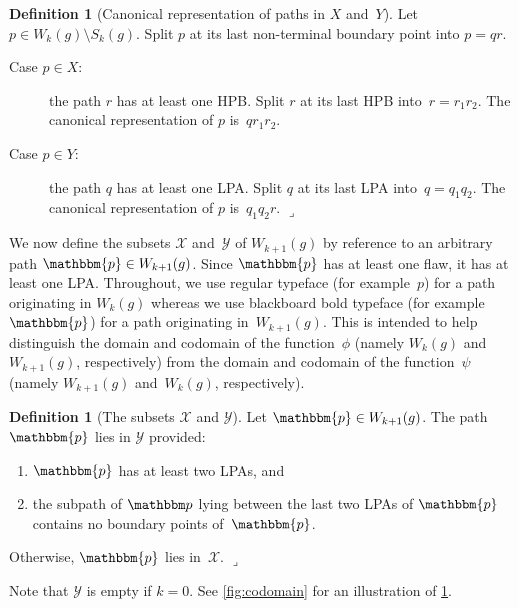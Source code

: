 \documentclass[11pt]{article}
\newcommand{\lrcornerqed}[0]{}
\renewcommand{\lrcornerqed}[0]{\hfill $\lrcorner$} %
\theoremstyle{definition} %
\newtheorem{definition}[thm]{Definition}
\numberwithin{equation}{section}
\begin{document}
\begin{definition}[Canonical representation of paths in $X$ and~$Y$]
\label{def:domain_split}
    Let $p \in W_k(g) \setminus S_k(g)$. Split $p$ at its last non-terminal boundary point into $p = q r$.
    \begin{description}

            \item[Case $p \in X$:]
            the path $r$ has at least one HPB. Split $r$ at its last HPB into~$r = r_1 r_2$. The canonical representation of $p$ is~$q r_1 r_2$.
    
        \item[Case $p \in Y$:]
            the path $q$ has at least one LPA. Split $q$ at its last LPA into~$q = q_1 q_2$. The canonical representation of $p$ is~$q_1 q_2 r$. \lrcornerqed
    \end{description}
\end{definition}


We now define the subsets $\mathcal{X}$ and~$\mathcal{Y}$ of $W_{k+1}(g)$ by reference to an arbitrary path $\mathbbm{p} \in W_{k+1}(g)$. 
Since $\mathbbm{p}$ has at least one flaw, it has at least one LPA.
Throughout, we use regular typeface (for example~$p$) for a path originating in $W_k(g)$ whereas we use blackboard bold typeface (for example~$\mathbbm{p}$) for a path originating in~$W_{k+1}(g)$.
This is intended to help distinguish the domain and codomain of the function~$\phi$ (namely $W_k(g)$ and~$W_{k+1}(g)$, respectively) from the domain and codomain of the function~$\psi$ (namely $W_{k+1}(g)$ and~$W_k(g)$, respectively).

\begin{definition}[The subsets $\mathcal{X}$ and $\mathcal{Y}$]
\label{def:codomain_partition}
    Let $\mathbbm{p} \in W_{k+1}(g)$. 
    The path $\mathbbm{p}$ lies in $\mathcal{Y}$ provided: 
    \begin{enumerate}[label=\textit{(\roman*)}]
        \item $\mathbbm{p}$ has at least two LPAs, and
        \label{def:codomain_partition:condition_1}
        
        \item the subpath of $\mathbbm p$ lying between the last two LPAs of $\mathbbm{p}$ contains no boundary points of~$\mathbbm{p}$.
        \label{def:codomain_partition:condition_2}
    \end{enumerate}
    Otherwise, $\mathbbm{p}$ lies in~$\mathcal{X}$. \lrcornerqed
\end{definition}
Note that $\mathcal{Y}$ is empty if $k=0$.
See \cref{fig:codomain} for an illustration of \cref{def:codomain_partition}.
\end{document}

